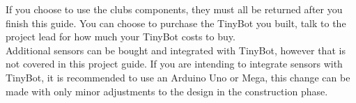 \documentclass[a4paper,12pt]{article}
\begin{document}
If you choose to use the clubs components, they must all be returned after you finish this guide. You can choose to purchase the TinyBot you built, talk to the project lead for how much your TinyBot costs to buy.\\

Additional sensors can be bought and integrated with TinyBot, however that is not covered in this project guide. If you are intending to integrate sensors with TinyBot, it is recommended to use an Arduino Uno or Mega, this change can be made with only minor adjustments to the design in the construction phase. \\



\end{document}
